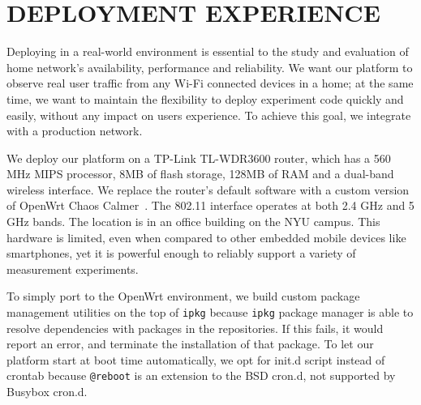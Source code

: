 \chapter{DEPLOYMENT EXPERIENCE} 
\label{ssec.deployment}
Deploying \sysname in a real-world environment is essential to the study and evaluation of home network's availability, performance and reliability. We want our platform to observe real user traffic from any Wi-Fi connected devices in a home; at the same time, we want to maintain the flexibility to deploy experiment code quickly and easily, without any impact on users experience. To achieve this goal, we integrate \sysname with a production network.

We deploy our platform on a TP-Link TL-WDR3600 router, which has a 560 MHz MIPS processor, 8MB of flash storage, 128MB of RAM and a dual-band wireless interface. We replace the router's default software with a custom version of OpenWrt Chaos Calmer~\cite{openwrt}. The 802.11 interface operates at both 2.4 GHz and 5 GHz bands. The location is in an office building on the NYU campus. This hardware is limited, even when compared to other embedded mobile devices like smartphones, yet it is powerful enough to reliably support a variety of measurement experiments.

To simply port to the OpenWrt environment, we build custom package management utilities on the top of \texttt{ipkg} because \texttt{ipkg} package manager is able to resolve dependencies with packages in the repositories. If this fails, it would report an error, and terminate the installation of that package. To let our platform start at boot time automatically, we opt for init.d script instead of crontab because \texttt{@reboot} is an extension to the BSD cron.d, not supported by Busybox cron.d.